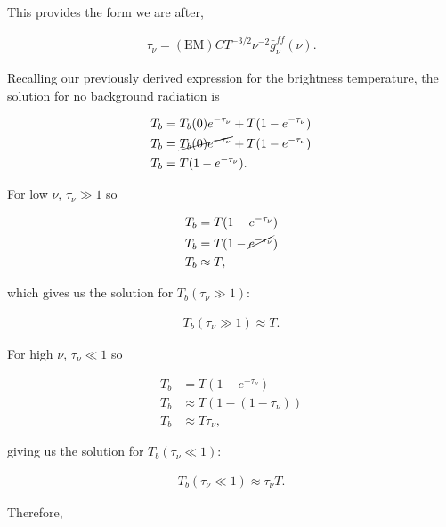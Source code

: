 \documentclass[12pt]{article}
\begin{document}
{\noindent}This provides the form we are after,

\begin{align*}
    \boxed{\tau_\nu = \mathrm{(EM)} C T^{-3/2} \nu^{-2}\bar{g}_\nu^{ff}(\nu)}.
\end{align*}

Recalling our previously derived expression for the brightness temperature, the solution for no background radiation is

\begin{equation*}
\begin{split}
    T_b &= T_b(0)e^{-\tau_\nu} + T(1-e^{-\tau_\nu}) \\
    T_b &= \cancel{T_b(0)e^{-\tau_\nu}} + T(1-e^{-\tau_\nu}) \\
    T_b &= T(1-e^{-\tau_\nu}).
\end{split}
\end{equation*}

{\noindent}For low $\nu$, $\tau_\nu\gg1$ so

\begin{equation*}
\begin{split}
    T_b &= T(1-e^{-\tau_\nu}) \\
    T_b &= T(1-\cancel{e^{-\tau_\nu}}) \\
    T_b &\approx T,
\end{split}
\end{equation*}

{\noindent}which gives us the solution for $T_b(\tau_\nu\gg1)$:

\begin{align*}
    T_b(\tau_\nu\gg1) \approx T.
\end{align*}

{\noindent}For high $\nu$, $\tau_\nu\ll1$ so

\begin{equation*}
\begin{split}
    T_b &= T(1-e^{-\tau_\nu}) \\
    T_b &\approx T(1 - (1-\tau_\nu)) \\
    T_b &\approx T\tau_\nu,
\end{split}
\end{equation*}

{\noindent}giving us the solution for $T_b(\tau_\nu\ll1)$:

\begin{align*}
    T_b(\tau_\nu\ll1) \approx \tau_\nu T.
\end{align*}

Therefore,
\end{document}
